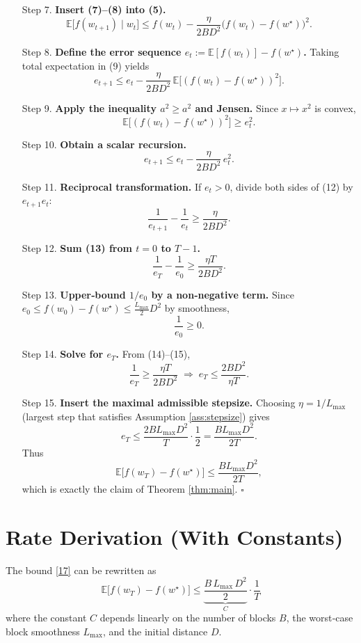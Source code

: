 \documentclass{article}
\newcommand{\EE}{\mathbb{E}}
\begin{document}
\begin{enumerate}
\item[Step 7.] \textbf{Insert (7)–(8) into (5).}
\[
\EE\!\bigl[f(w_{t+1})\mid w_t\bigr]
\le f(w_t)-\frac{\eta}{2B D^{2}}\bigl(f(w_t)-f(w^{\star})\bigr)^{2}.
\tag{9}
\]

\item[Step 8.] \textbf{Define the error sequence $e_t:=\EE[f(w_t)]-f(w^{\star})$.}  
Taking total expectation in (9) yields
\[
e_{t+1}\le e_t-\frac{\eta}{2B D^{2}}\,\EE\!\bigl[(f(w_t)-f(w^{\star}))^{2}\bigr].
\tag{10}
\]

\item[Step 9.] \textbf{Apply the inequality $a^{2}\ge a^{2}$ and Jensen.}  
Since $x\mapsto x^{2}$ is convex,
\[
\EE\!\bigl[(f(w_t)-f(w^{\star}))^{2}\bigr]\ge e_t^{2}.
\tag{11}
\]

\item[Step 10.] \textbf{Obtain a scalar recursion.}
\[
e_{t+1}\le e_t-\frac{\eta}{2B D^{2}}\,e_t^{2}.
\tag{12}
\]

\item[Step 11.] \textbf{Reciprocal transformation.}  
If $e_t>0$, divide both sides of (12) by $e_{t+1}e_t$:
\[
\frac{1}{e_{t+1}}-\frac{1}{e_t}\ge \frac{\eta}{2B D^{2}}.
\tag{13}
\]

\item[Step 12.] \textbf{Sum (13) from $t=0$ to $T-1$.}
\[
\frac{1}{e_T}-\frac{1}{e_0}\ge \frac{\eta T}{2B D^{2}}.
\tag{14}
\]

\item[Step 13.] \textbf{Upper‑bound $1/e_0$ by a non‑negative term.}  
Since $e_0\le f(w_0)-f(w^{\star})\le \frac{L_{\max}}{2}D^{2}$ by smoothness,
\[
\frac{1}{e_0}\ge 0.
\tag{15}
\]

\item[Step 14.] \textbf{Solve for $e_T$.}  
From (14)–(15),
\[
\frac{1}{e_T}\ge \frac{\eta T}{2B D^{2}}
\;\Longrightarrow\;
e_T\le \frac{2B D^{2}}{\eta T}.
\tag{16}
\]

\item[Step 15.] \textbf{Insert the maximal admissible stepsize.}  
Choosing $\eta=1/L_{\max}$ (largest step that satisfies Assumption
\ref{ass:stepsize}) gives
\[
e_T\le \frac{2B L_{\max} D^{2}}{T}\cdot\frac12
     =\frac{B L_{\max} D^{2}}{2T}.
\tag{17}
\]
Thus
\[
\EE\!\bigl[f(w_T)-f(w^{\star})\bigr]\le\frac{B L_{\max} D^{2}}{2T},
\]
which is exactly the claim of Theorem \ref{thm:main}.  $\square$
\end{enumerate}

\section*{Rate Derivation (With Constants)}
The bound \eqref{17} can be rewritten as
\[
\boxed{\;
\EE\!\bigl[f(w_T)-f(w^{\star})\bigr]
\le \underbrace{\frac{B\,L_{\max}\,D^{2}}{2}}_{\displaystyle C}
\cdot\frac{1}{T}
\;}
\]
where the constant $C$ depends linearly on the number of blocks $B$,
the worst‑case block smoothness $L_{\max}$, and the initial distance $D$.
\end{document}
